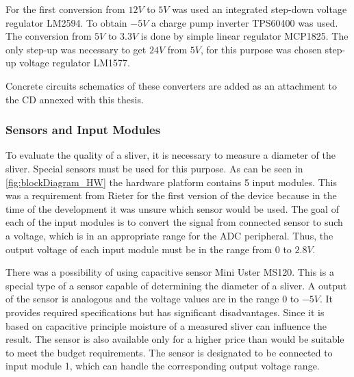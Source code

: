 \documentclass[twoside]{ctuthesis}
\theoremstyle{plain}
\theoremstyle{definition}
\theoremstyle{note}
\begin{document}
For the first conversion from $12 V$ to $5 V$ was used an integrated step-down voltage regulator LM2594. To obtain $-5 V$ a charge pump inverter TPS60400 was used. The conversion from $5 V$ to $3.3 V$ is done by simple linear regulator MCP1825. The only step-up was necessary to get $24 V$ from $5 V$, for this purpose was chosen step-up voltage regulator LM1577.

Concrete circuits schematics of these converters are added as an attachment to the CD annexed with this thesis.

\subsubsection{Sensors and Input Modules}
\label{sec:Sensors}
To evaluate the quality of a sliver, it is necessary to measure a diameter of the sliver. Special sensors must be used for this purpose. 
As can be seen in \ref{fig:blockDiagram_HW} the hardware platform contains 5 input modules. This was a requirement from Rieter for the first version of the device because in the time of the development it was unsure which sensor would be used. The goal of each of the input modules is to convert the signal from connected sensor to such a voltage, which is in an appropriate range for the ADC peripheral. Thus, the output voltage of each input module must be in the range from $0$ to $2.8V$.

There was a possibility of using capacitive sensor Mini Uster MS120. This is a special type of a sensor capable of determining the diameter of a sliver. A output of the sensor is analogous and the voltage values are in the range $0$ to $-5V$. It provides required specifications but has significant disadvantages. Since it is based on capacitive principle moisture of a measured sliver can influence the result. The sensor is also available only for a higher price than would be suitable to meet the budget requirements. The sensor is designated to be connected to input module 1, which can handle the corresponding output voltage range.
\end{document}
